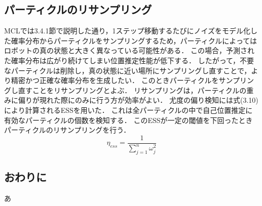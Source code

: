 \subsection{パーティクルのリサンプリング}
MCLでは3.4.1節で説明した通り，1ステップ移動するたびにノイズをモデル化した確率分布からパーティクルをサンプリングするため，パーティクルによってはロボットの真の状態と大きく異なっている可能性がある．
この場合，予測された確率分布は広がり続けてしまい位置推定性能が低下する．
したがって，不要なパーティクルは削除し，真の状態に近い場所にサンプリングし直すことで，より精密かつ正確な確率分布を生成したい．
このときパーティクルをサンプリングし直すことをリサンプリングとよぶ．
リサンプリングは，パーティクルの重みに偏りが現れた際にのみに行う方が効率がよい．
尤度の偏り検知には式(3.10)により計算されるESSを用いた．
これは全パーティクルの中で自己位置推定に有効なパーティクルの個数を検知する．
このESSが一定の閾値を下回ったときパーティクルのリサンプリングを行う．
\begin{equation}
 \displaystyle \eta _{ess} =\frac{1}{\sum _{j=1}^{n} \omega _{j}^{2}}   
\end{equation}

\subsection{おわりに}
あ